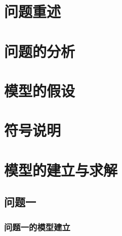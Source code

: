 


  \title{} %
  \tihao{}
  \baominghao{}
  \schoolname{}
  \membera{} %
  \memberb{}
  \memberc{}
  \supervisor{}

\makeatletter
{}
\makeatother



\usepackage{subfiles}  %


\listoftodos
\maketitle



\section{问题重述}
  
\section{问题的分析}
  
\section{模型的假设}
  
\section{符号说明}
  
\section{模型的建立与求解}

\subsection{问题一}
  \subsubsection{问题一的模型建立}
    
